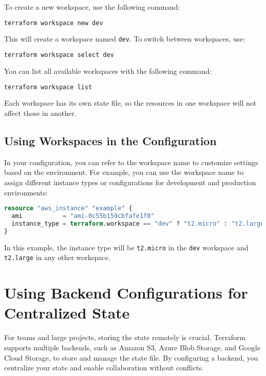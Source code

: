 To create a new workspace, use the following command:

\begin{lstlisting}[language=bash]
terraform workspace new dev
\end{lstlisting}

This will create a workspace named \texttt{dev}. To switch between workspaces, use:

\begin{lstlisting}[language=bash]
terraform workspace select dev
\end{lstlisting}

You can list all available workspaces with the following command:

\begin{lstlisting}[language=bash]
terraform workspace list
\end{lstlisting}

Each workspace has its own state file, so the resources in one workspace will not affect those in another.

\subsection{Using Workspaces in the Configuration}

In your configuration, you can refer to the workspace name to customize settings based on the environment. For example, you can use the workspace name to assign different instance types or configurations for development and production environments:

\begin{lstlisting}[language=terraform]
resource "aws_instance" "example" {
  ami           = "ami-0c55b159cbfafe1f0"
  instance_type = terraform.workspace == "dev" ? "t2.micro" : "t2.large"
}
\end{lstlisting}

In this example, the instance type will be \texttt{t2.micro} in the \texttt{dev} workspace and \texttt{t2.large} in any other workspace.

\section{Using Backend Configurations for Centralized State}

For teams and large projects, storing the state remotely is crucial. Terraform supports multiple backends, such as Amazon S3, Azure Blob Storage, and Google Cloud Storage, to store and manage the state file. By configuring a backend, you centralize your state and enable collaboration without conflicts.

